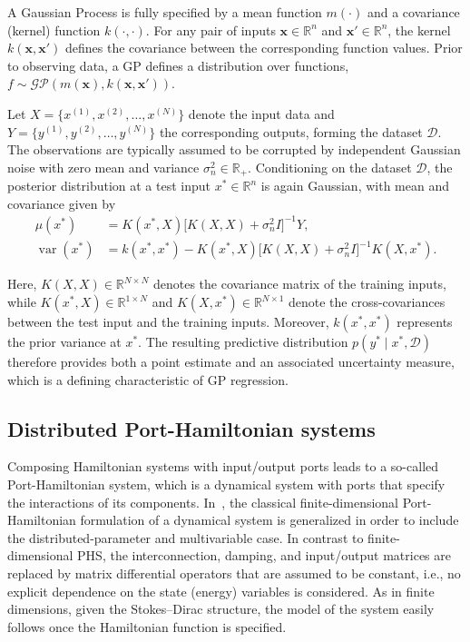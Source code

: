 \documentclass[letterpaper, 10 pt, conference]{ieeeconf}  %
\newcommand{\R}{\mathbb{R}}
\newcommand{\bm}[1]{{\boldsymbol{#1}}}
\DeclareMathOperator{\var}{var}
\newcommand{\x}{\bm x}
\begin{document}
A Gaussian Process is fully specified by a mean function $m(\cdot)$ and a covariance (kernel) function $k(\cdot,\cdot)$. 
For any pair of inputs $\x\in\R^n$ and $\x'\in\R^n$, the kernel $k(\x,\x')$ defines the covariance between the corresponding function values. 
Prior to observing data, a GP defines a distribution over functions, $f \sim \mathcal{GP}(m(\x), k(\x,\x'))$.


Let $X = \{x^{(1)}, x^{(2)}, \dots, x^{(N)}\}$ denote the input data and $Y = \{y^{(1)}, y^{(2)}, \dots, y^{(N)}\}$ the corresponding outputs, forming the dataset $\mathcal{D}$. 
The observations are typically assumed to be corrupted by independent Gaussian noise with zero mean and variance $\sigma_n^2\in\R_+$. Conditioning on the dataset $\mathcal{D}$, the posterior distribution at a test input $x^*\in\R^n$ is again Gaussian, with mean and covariance given by
\begin{align}
    \mu(x^*) &\!=\! K(x^*, X)\bigl[K(X,X) + \sigma_n^2 I\bigr]^{-1} Y, \label{for:PostMean}\\
    \var(x^*) &\!=\! k(x^*,x^*) \!-\! K(x^*,X)\bigl[K(X,X)\! +\! \sigma_n^2 I\bigr]^{-1}K(X,x^*). \label{for:PostVar}
\end{align}

Here, $K(X,X)\in\R^{N\times N}$ denotes the covariance matrix of the training inputs, while $K(x^*,X)\in\R^{1\times N}$ and $K(X,x^*)\in\R^{N\times 1}$ denote the cross-covariances between the test input and the training inputs. Moreover, $k(x^*,x^*)$ represents the prior variance at $x^*$. 
The resulting predictive distribution $p(y^* \mid x^*, \mathcal{D})$ therefore provides both a point estimate and an associated uncertainty measure, which is a defining characteristic of GP regression.

\subsection{Distributed Port-Hamiltonian systems}
Composing Hamiltonian systems with input/output ports leads to a so-called Port-Hamiltonian system, which is a dynamical system with ports that specify the interactions of its components. In~\cite{macchelli2004port}, the classical finite-dimensional Port-Hamiltonian formulation of a dynamical system is generalized in order to include the distributed-parameter and multivariable case. In contrast to finite-dimensional PHS, the interconnection, damping, and input/output matrices are replaced by matrix differential operators that are assumed to be constant, i.e., no explicit dependence on the state (energy) variables is considered. As in finite dimensions, given the Stokes--Dirac structure, the model of the system easily follows once the Hamiltonian function is specified. 
\end{document}

